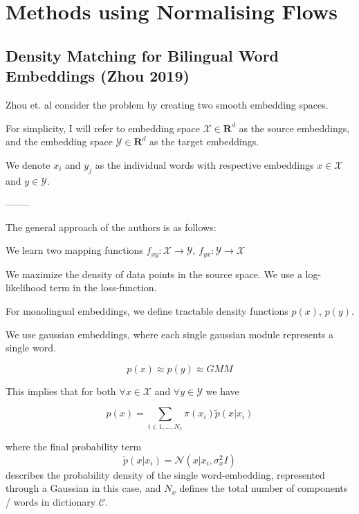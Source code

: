 \documentclass[a4paper,12pt,twoside,openright]{report}
\begin{document}
\section{Methods using Normalising Flows}

\subsection{Density Matching for Bilingual Word Embeddings (Zhou 2019)}

Zhou et. al consider the problem by creating two smooth embedding spaces.

For simplicity, I will refer to embedding space $\mathcal{X} \in \mathbf{R}^d$ as the source embeddings, and the embedding space $\mathcal{Y} \in \mathbf{R}^d$ as the target embeddings. 

We denote $ x_i $ and $y_j$ as the individual words with respective embeddings $x \in \mathcal{X}$ and $y \in \mathcal{Y}$.

--------

The general approach of the authors is as follows:

We learn two mapping functions $f_{xy} : \mathcal{X} \rightarrow \mathcal{Y}$, $f_{yx} : \mathcal{Y} \rightarrow \mathcal{X}$

We maximize the density of data points in the source space. 
We use a log-likelihood term in the loss-function.

For monolingual embeddings, we define tractable density functions $p(x)$, $p(y)$.

We use gaussian embeddings, where each single gaussian module represents a single word.

\begin{equation}
p(x) \approx p(y) \approx GMM
\end{equation}

This implies that for both $\forall x \in \mathcal{X}$ and $\forall y \in \mathcal{Y}$ we have

\begin{equation}
p(x) = \sum_{i \in {1, \ldots, N_x} } \pi(x_i) \tilde{p}(x|x_i)
\end{equation}

where the final probability term $$\tilde{p}(x|x_i) = \mathcal{N}(x | x_i, \sigma^2_x I) $$ describes the probability density of the single word-embedding, represented through a Gaussian in this case, and $N_x$ defines the total number of components / words in dictionary $\mathcal{C}$.
\end{document}
